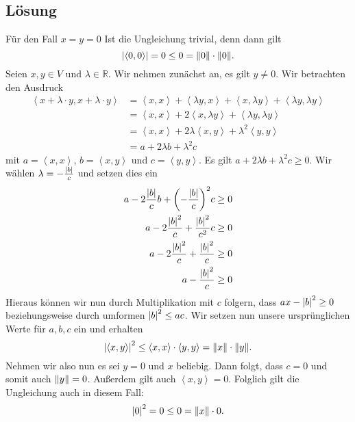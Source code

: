 \documentclass[german,12pt]{homework}
\newcommand{\RR}{\mathbb{R}}
\newcommand{\dotproduct}[2]{\left\langle#1, #2\right\rangle}
\DeclarePairedDelimiter{\absolute}{\lvert}{\rvert}
\DeclarePairedDelimiter{\norm}{\lVert}{\rVert}
\DeclarePairedDelimiter{\enbrace}{(}{)}
\begin{document}
    \subsection*{Lösung} Für den Fall \(x = y = 0\) Ist die Ungleichung trivial, denn dann gilt
    \[\absolute*{\dotproduct{0}{0}} = 0 \le 0 = \norm*{0} \cdot \norm*{0}.\]
    Seien \(x, y \in V\) und \(\lambda \in \RR\). Wir nehmen zunächst an, es gilt \(y \ne 0\). Wir betrachten den Ausdruck
    \begin{align*}
        \dotproduct{x + \lambda \cdot y}{x + \lambda \cdot y} &= \dotproduct{x}{x} + \dotproduct{\lambda{y}}{x} + \dotproduct{x}{\lambda{y}} + \dotproduct{\lambda{y}}{\lambda{y}}\\
        &= \dotproduct{x}{x} + 2\dotproduct{x}{\lambda{y}} + \dotproduct{\lambda{y}}{\lambda{y}}\\
        &= \dotproduct{x}{x} + 2\lambda\dotproduct{x}{y} + \lambda^2\dotproduct{y}{y}\\
        &= a + 2\lambda{b} + \lambda^2c
    \end{align*}
    mit \(a = \dotproduct{x}{x}\), \(b = \dotproduct{x}{y}\) und \(c = \dotproduct{y}{y}\). Es gilt \(a + 2\lambda{b} + \lambda^2c \ge 0\). Wir wählen \(\lambda = -\frac{\absolute*{b}}{c}\) und setzen dies ein
    \begin{align*}
        a - 2\frac{\absolute*{b}}{c}b + \enbrace*{-\frac{\absolute*{b}}{c}}^2c &\ge 0\\
        a - 2\frac{\absolute*{b}^2}{c} + \frac{\absolute*{b}^2}{c^2}c &\ge 0\\
        a - 2\frac{\absolute*{b}^2}{c} + \frac{\absolute*{b}^2}{c} &\ge 0\\
        a - \frac{\absolute*{b}^2}{c} &\ge 0
    \end{align*}
    Hieraus können wir nun durch Multiplikation mit \(c\) folgern, dass \(ax - \absolute*{b}^2 \ge 0\) beziehungsweise durch umformen \(\absolute*{b}^2 \le ac\). Wir setzen nun unsere ursprünglichen Werte für \(a, b, c\) ein und erhalten
    \[\absolute*{\dotproduct{x}{y}}^2 \le \dotproduct{x}{x} \cdot \dotproduct{y}{y} = \norm*{x} \cdot \norm*{y}.\]
    Nehmen wir also nun es sei \(y = 0\) und \(x\) beliebig. Dann folgt, dass \(c = 0\) und somit auch \(\norm*{y} = 0\). Außerdem gilt auch \(\dotproduct{x}{y} = 0\). Folglich gilt die Ungleichung auch in diesem Fall:
    \[\absolute*{0}^2 = 0 \le 0 = \norm*{x} \cdot 0.\]
\end{document}
